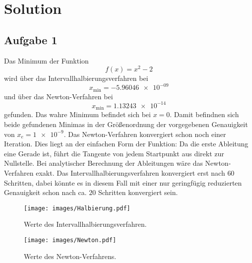 
\section{Solution}
\label{sec:auswertung}

\subsection{Aufgabe 1} 

Das Minimum der Funktion 
\begin{equation}
    f(x) = x^2 - 2
\end{equation}
wird über das Intervallhalbierungsverfahren bei 
\begin{equation}
    x_\text{min} =  \num{-5.96046e-09}
\end{equation}
und über das Newton-Verfahren bei
\begin{equation}
    x_\text{min} = \num{1.13243e-14}
\end{equation}
gefunden.
Das wahre Minimum befindet sich bei $x=0$. Damit befindnen sich beide gefundenen Minimas in der Größenordnung der vorgegebenen Genauigkeit von $x_e = \num{1e-9}$.
Das Newton-Verfahren konvergiert schon noch einer Iteration. Dies liegt an der einfachen Form der Funktion: 
Da die erste Ableitung eine Gerade ist, führt die Tangente von jedem Startpunkt aus direkt zur Nullstelle. Bei analytischer Berechnung der Ableitungen wäre das Newton-Verfahren exakt.
Das Intervallhalbierungsverfahren konvergiert erst nach $60$ Schritten, dabei könnte es in diesem Fall mit einer nur geringfügig reduzierten Genauigkeit schon nach ca. $20$ Schritten konvergiert sein.

\begin{figure}
    \centering
    \texttt{[image: images/Halbierung.pdf]}
    \caption{Werte des Intervallhalbierungsverfahren.}
\end{figure}

\begin{figure}
    \centering
    \texttt{[image: images/Newton.pdf]}
    \caption{Werte des Newton-Verfahrens.}
\end{figure}